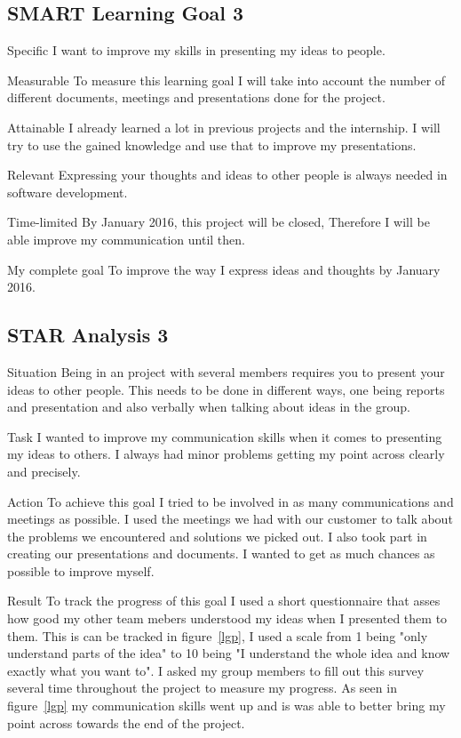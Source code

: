 \documentclass[12pt]{article}
\begin{document}
\subsection{SMART Learning Goal 3}
\begin{SMART}
    \item[Specific] I want to improve my skills in presenting my ideas to people.
    \item[Measurable] To measure this learning goal I will take into account the number of different documents, meetings and presentations done for the project.
    \item[Attainable] I already learned a lot in previous projects and the internship. I will try to use the gained knowledge and use that to improve my presentations.
    \item[Relevant] Expressing your thoughts and ideas to other people is always needed in software development.
    \item[Time-limited] By January 2016, this project will be closed, Therefore I will be able improve my communication until then.
    \item[My complete goal] To improve the way I express ideas and thoughts by January 2016.
\end{SMART}

\subsection{STAR Analysis 3}
\begin{STAR}
    \item[Situation] Being in an project with several members requires you to present your ideas to other people. This needs to be done in different ways, one being reports and presentation and also verbally when talking about ideas in the group.
    \item[Task]
    I wanted to improve my communication skills when it comes to presenting my ideas to others. I always had minor problems getting my point across clearly and precisely.
    \item[Action] To achieve this goal I tried to be involved in as many communications and meetings as possible. I used the meetings we had with our customer to talk about the problems we encountered and solutions we picked out. I also took part in creating our presentations and documents. I wanted to get as much chances as possible to improve myself.
    \item[Result]
    To track the progress of this goal I used a short questionnaire that asses how good my other team mebers understood my ideas when I presented them to them. This is can be tracked in figure~\ref{lgp}, I used a scale from 1 being "only understand parts of the idea" to 10 being "I understand the whole idea and know exactly what you want to". I asked my group members to fill out this survey several time throughout the project to measure my progress. As seen in figure~\ref{lgp} my communication skills went up and is was able to better bring my point across towards the end of the project.
\end{STAR}



%
\end{document}
